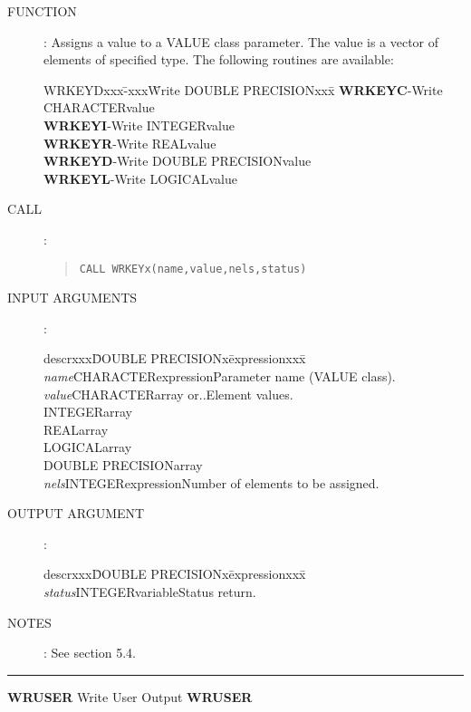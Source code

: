 \documentclass{article}
\begin{document}
\begin{description}
\item [FUNCTION]:
Assigns a value to a VALUE class parameter.
The value is a vector of elements of specified type.
The following routines are available:
\begin{center}
\begin{tabbing}
WRKEYDxxx\=-xxx\=Write DOUBLE PRECISIONxxx\=\kill
{\bf WRKEYC}\>-\>Write CHARACTER\>value\\
{\bf WRKEYI}\>-\>Write INTEGER\>value\\
{\bf WRKEYR}\>-\>Write REAL\>value\\
{\bf WRKEYD}\>-\>Write DOUBLE PRECISION\>value\\
{\bf WRKEYL}\>-\>Write LOGICAL\>value
\end{tabbing}
\end{center}
\item [CALL]:
\begin{quote}
{\tt CALL WRKEYx(name,value,nels,status)}
\end{quote}
\item [INPUT ARGUMENTS]:
\begin{tabbing}
descrxxx\=DOUBLE PRECISIONx\=expressionxxx\=\kill
{\em name}\>CHARACTER\>expression\>Parameter name (VALUE class).\\
{\em value}\>CHARACTER\>array or..\>Element values.\\
\>INTEGER\>array\\
\>REAL\>array\\
\>LOGICAL\>array\\
\>DOUBLE PRECISION\>array\\
{\em nels}\>INTEGER\>expression\>Number of elements to be assigned.
\end{tabbing}
\item [OUTPUT ARGUMENT]:
\begin{tabbing}
descrxxx\=DOUBLE PRECISIONx\=expressionxxx\=\kill
{\em status}\>INTEGER\>variable\>Status return.
\end{tabbing}
\item [NOTES]:
See section 5.4.
\end{description}
\rule{\textwidth}{0.3mm}
{\Large {\bf WRUSER} \hfill Write User Output \hfill {\bf WRUSER}}
\end{document}
